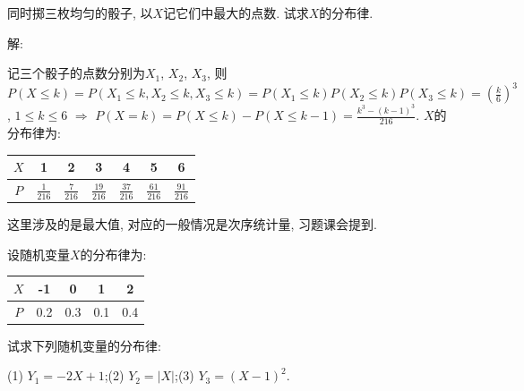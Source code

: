 \documentclass[standard]{ExBook}
\renewenvironment{shaded}{%
  \def\FrameCommand{\fboxsep=\FrameSep \colorbox{shadecolor}}%
  \MakeFramed{\advance\hsize-\width \FrameRestore}%
}{%
  \endMakeFramed
}
\begin{document}
\begin{qitems}
\vspace{2.5cm-5em}

    \begin{bbox}
    \begin{shaded}
        \qitem
同时掷三枚均匀的骰子, 以$X$记它们中最大的点数. 试求$X$的分布律.
    \end{shaded}
    \end{bbox}

\vspace{\dimexpr2.5cm-5em\relax}

解: 

记三个骰子的点数分别为$X_1$, $X_2$, $X_3$, 则$P(X\leq k)=P(X_1\leq k,X_2\leq k,X_3\leq k)=P(X_1\leq k)P(X_2\leq k)P(X_3\leq k)=\left(\frac{k}{6}\right)^3$, $1\leq k\leq 6$ $\Longrightarrow$ $P(X=k)=P(X\leq k)-P(X\leq k-1)=\frac{k^3-(k-1)^3}{216}$. $X$的分布律为:
\begin{center}
\setlength{\tabcolsep}{14pt}
\begin{tabular}{c|cccccc}
    \hline
    $X$ & 1 & 2 & 3 & 4 & 5 & 6 \\
    \hline
    $P$ & $\frac{1}{216}$ & $\frac{7}{216}$ & $\frac{19}{216}$ & $\frac{37}{216}$ & $\frac{61}{216}$ & $\frac{91}{216}$ \\
    \hline
\end{tabular}
\end{center}

\textcolor{themeColor}{\selectfont {} 这里涉及的是最大值, 对应的一般情况是次序统计量, 习题课会提到.}

\vspace{2.5cm-5em}

    \begin{bbox}
    \begin{shaded}
        \qitem
设随机变量$X$的分布律为:
\begin{center}
\setlength{\tabcolsep}{20pt}
\begin{tabular}{c|cccc}
$X$ & -1 & 0 & 1 & 2\\
\hline
$P$ & 0.2 & 0.3 & 0.1 & 0.4\\
\end{tabular}
\end{center}
试求下列随机变量的分布律: 

(1) $Y_{1}=-2X+1$;\qquad(2) $Y_{2}=|X|$;\qquad(3) $Y_{3}=(X-1)^2$.
    \end{shaded}
    \end{bbox}

\vspace{\dimexpr2.5cm-5em\relax}


\end{qitems}
\end{document}
